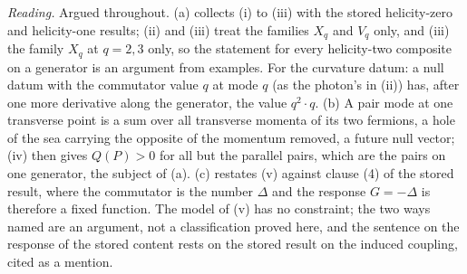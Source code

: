 \emph{Reading.} Argued throughout. (a) collects (i) to (iii) with the stored helicity-zero and helicity-one results; (ii) and (iii) treat the families $X_{q}$ and $V_{q}$ only, and (iii) the family $X_{q}$ at $q = 2, 3$ only, so the statement for every helicity-two composite on a generator is an argument from examples. For the curvature datum: a null datum with the commutator value $q$ at mode $q$ (as the photon's in (ii)) has, after one more derivative along the generator, the value $q^{2}\cdot q$. (b) A pair mode at one transverse point is a sum over all transverse momenta of its two fermions, a hole of the sea carrying the opposite of the momentum removed, a future null vector; (iv) then gives $Q(P) > 0$ for all but the parallel pairs, which are the pairs on one generator, the subject of (a). (c) restates (v) against clause (4) of the stored result, where the commutator is the number $\Delta$ and the response $G = -\Delta$ is therefore a fixed function. The model of (v) has no constraint; the two ways named are an argument, not a classification proved here, and the sentence on the response of the stored content rests on the stored result on the induced coupling, cited as a mention.
